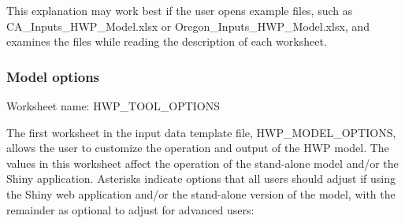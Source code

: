 \documentclass[
  openany]{book}
\begin{document}
This explanation may work best if the user opens example files, such as
CA\_Inputs\_HWP\_Model.xlsx or Oregon\_Inputs\_HWP\_Model.xlsx, and
examines the files while reading the description of each worksheet.

\hypertarget{own-prov-input-options}{%
\subsubsection{Model options}\label{own-prov-input-options}}

Worksheet name: HWP\_TOOL\_OPTIONS

The first worksheet in the input data template file,
HWP\_MODEL\_OPTIONS, allows the user to customize the operation and
output of the HWP model. The values in this worksheet affect the
operation of the stand-alone model and/or the Shiny application.
Asterisks indicate options that all users should adjust if using the
Shiny web application and/or the stand-alone version of the model, with
the remainder as optional to adjust for advanced users:
\end{document}
